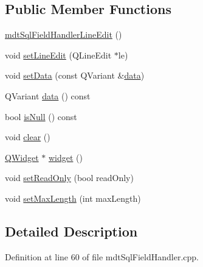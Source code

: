 \subsection*{Public Member Functions}
\begin{DoxyCompactItemize}
\item 
\hyperlink{classmdt_sql_field_handler_line_edit_a141328a067ae9ee08531cb5c0689439a}{mdt\-Sql\-Field\-Handler\-Line\-Edit} ()
\item 
void \hyperlink{classmdt_sql_field_handler_line_edit_a2b4477f48226a6e69faf3e3040da63b1}{set\-Line\-Edit} (Q\-Line\-Edit $\ast$le)
\item 
void \hyperlink{classmdt_sql_field_handler_line_edit_aabd6a72556f2389b9ea8cac1d26c0479}{set\-Data} (const Q\-Variant \&\hyperlink{classmdt_sql_field_handler_line_edit_a0c6a7f100ecadc373c55d2c590044da4}{data})
\item 
Q\-Variant \hyperlink{classmdt_sql_field_handler_line_edit_a0c6a7f100ecadc373c55d2c590044da4}{data} () const 
\item 
bool \hyperlink{classmdt_sql_field_handler_line_edit_ad492eab28cb88bfe623ec3af04aeeb1f}{is\-Null} () const 
\item 
void \hyperlink{classmdt_sql_field_handler_line_edit_ad41a3af3230333d74ac688a5e91354b4}{clear} ()
\item 
\hyperlink{class_q_widget}{Q\-Widget} $\ast$ \hyperlink{classmdt_sql_field_handler_line_edit_a475426ca27aea03d01f31c7d9c8bb5ba}{widget} ()
\item 
void \hyperlink{classmdt_sql_field_handler_line_edit_ab282e2ce51a42e55286111089526b6bb}{set\-Read\-Only} (bool read\-Only)
\item 
void \hyperlink{classmdt_sql_field_handler_line_edit_a5a7599a112fd4d74ff0d50cb72e5998c}{set\-Max\-Length} (int max\-Length)
\end{DoxyCompactItemize}


\subsection{Detailed Description}


Definition at line 60 of file mdt\-Sql\-Field\-Handler.\-cpp.




